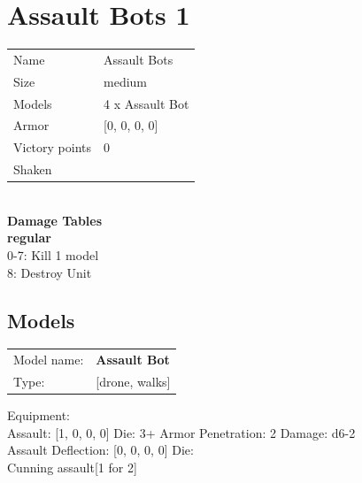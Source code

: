  















\clearpage

\section{ Assault Bots 1 }

\begin{tabular}{ll}
  Name & Assault Bots \\
  Size & medium\\
  Models & 4 x Assault Bot\\
  Armor & [0, 0, 0, 0]\\
  Victory points & 0\\
  Shaken & \\
\end{tabular}

\\ 



{\bf Damage Tables} \\
 {\bf regular } \\
0-7: Kill 1 model \\
8: Destroy Unit \\


\clearpage

\subsection{ Models }

\begin{tabular}{ll}
Model name: & {\bf Assault Bot } \\
Type: & [drone, walks] \\
\end{tabular}

Equipment:  \\

Assault: [1, 0, 0, 0] Die: 3+ Armor Penetration: 2 Damage: d6-2 \\
Assault Deflection: [0, 0, 0, 0] Die: \\
\indent Cunning assault[1 for 2]\\ 
 




 















